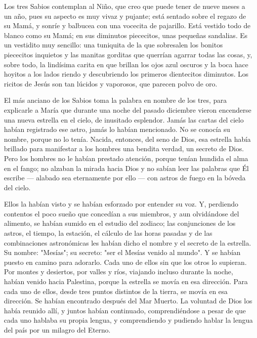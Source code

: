 \documentclass[12pt]{book} %
\begin{document}
Los tres Sabios contemplan al Niño, que creo que puede tener de nueve meses a un año, pues su aspecto es muy vivaz y pujante; está sentado sobre el regazo de su Mamá, y sonríe y balbucea con una vocecita de pajarillo. Está vestido todo de blanco como su Mamá; en sus diminutos piececitos, unas pequeñas sandalias. Es un vestidito muy sencillo: una tuniquita de la que sobresalen los bonitos piececitos inquietos y las manitas gorditas que querrían agarrar todas las cosas, y, sobre todo, la lindísima carita en que brillan los ojos azul oscuros y la boca hace hoyitos a los lados riendo y descubriendo los primeros dientecitos diminutos. Los ricitos de Jesús son tan lúcidos y vaporosos, que parecen polvo de oro. 

El más anciano de los Sabios toma la palabra en nombre de los tres, para explicarle a María que durante una noche del pasado diciembre vieron encenderse una nueva estrella en el cielo, de inusitado esplendor. Jamás las cartas del cielo habían registrado ese astro, jamás lo habían mencionado. No se conocía su nombre, porque no lo tenía. Nacida, entonces, del seno de Dios, esa estrella había brillado para manifestar a los hombres una bendita verdad, un secreto de Dios. Pero los hombres no le habían prestado atención, porque tenían hundida el alma en el fango; no alzaban la mirada hacia Dios y no sabían leer las palabras que Él escribe — alabado sea eternamente por ello — con astros de fuego en la bóveda del cielo. 

Ellos la habían visto y se habían esforzado por entender su voz. Y, perdiendo contentos el poco sueño que concedían a sus miembros, y aun olvidándose del alimento, se habían sumido en el estudio del zodiaco; las conjunciones de los astros, el tiempo, la estación, el cálculo de las horas pasadas y de las combinaciones astronómicas les habían dicho el nombre y el secreto de la estrella. Su nombre: "Mesías"; su secreto: "ser el Mesías venido al mundo". Y se habían puesto en camino para adorarlo. Cada uno de ellos sin que los otros lo supieran. Por montes y desiertos, por valles y ríos, viajando incluso durante la noche, habían venido hacia Palestina, porque la estrella se movía en esa dirección. Para cada uno de ellos, desde tres puntos distintos de la tierra, se movía en esa dirección. Se habían encontrado después del Mar Muerto. La voluntad de Dios los había reunido allí, y juntos habían continuado, comprendiéndose a pesar de que cada uno hablaba su propia lengua, y comprendiendo y pudiendo hablar la lengua del país por un milagro del Eterno. 
\end{document}

